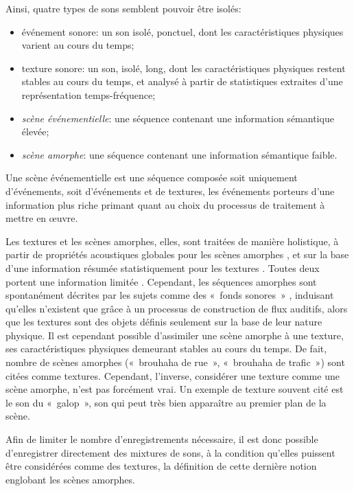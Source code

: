 Ainsi, quatre types de sons semblent pouvoir être isolés:

\begin{itemize}
\item {événement sonore}: un son isolé, ponctuel, dont les caractéristiques physiques varient au cours du temps;
\item {texture sonore}: un son, isolé, long, dont les caractéristiques physiques restent stables au cours du temps, et analysé à partir de statistiques extraites d'une représentation temps-fréquence;
\item \emph{scène événementielle}: une séquence contenant une information sémantique élevée;
\item \emph{scène amorphe}: une séquence contenant une information sémantique faible.
\end{itemize}

Une scène événementielle est une séquence composée soit uniquement d'événements, soit d'événements et de textures, les événements porteurs d'une information plus riche primant quant au choix du processus de traitement à mettre en œuvre.
 
Les textures et les scènes amorphes, elles, sont traitées de manière holistique, à partir de propriétés acoustiques globales pour les scènes amorphes \citep{dubois2006cognitive,maffiolo_caracterisation_1999}, et sur la base d'une information résumée statistiquement pour les textures \citep{mcdermott2013summary}. Toutes deux portent une information limitée \citep{saint1995classification,nelken2013ear}. Cependant, les séquences amorphes sont spontanément décrites par les sujets comme des «~fonds sonores~» \citep{maffiolo_caracterisation_1999,guastavino2006ideal}, induisant qu'elles n'existent que grâce à un processus de construction de flux auditifs, alors que les textures sont des objets définis seulement sur la base de leur nature physique. Il est cependant possible d'assimiler une scène amorphe à une texture, ses caractéristiques physiques demeurant stables au cours du temps. De fait, nombre de scènes amorphes («~brouhaha de rue~», «~brouhaha de trafic~») sont citées comme textures. Cependant, l'inverse, considérer une texture comme une scène amorphe, n'est pas forcément vrai.
Un exemple de texture souvent cité est le son du «~galop~», son qui peut très bien apparaître au premier plan de la scène.

Afin de limiter le nombre d'enregistrements nécessaire, il est donc possible d'enregistrer directement des mixtures de sons, à la condition qu'elles puissent être considérées comme des textures, la définition de cette dernière notion englobant les scènes amorphes. 

